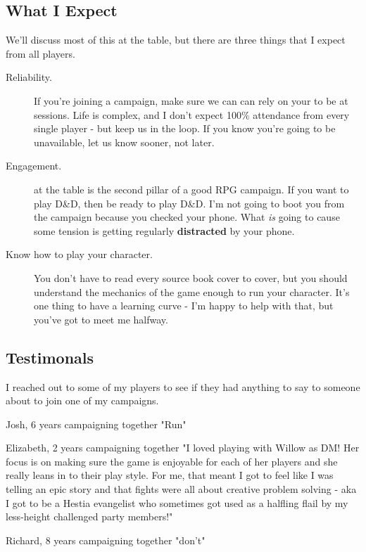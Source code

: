 \subsection{What I Expect}

We'll discuss most of this at the table, but there are three things that I expect from all players.

\begin{description}
    \item[Reliability.] If you're joining a campaign, make sure we can can rely on your to be at sessions. Life is complex, and I don't expect 100\% attendance from every single player - but keep us in the loop. If you know you're going to be unavailable, let us know sooner, not later.

    \item[Engagement.] at the table is the second pillar of a good RPG campaign. If you want to play D\&D, then be ready to play D\&D. I'm not going to boot you from the campaign because you checked your phone. What \textit{is} going to cause some tension is getting regularly \textbf{distracted} by your phone.

    \item[Know how to play your character.] You don't have to read every source book cover to cover, but you should understand the mechanics of the game enough to run your character. It's one thing to have a learning curve - I'm happy to help with that, but you've got to meet me halfway.
\end{description}

\subsection {Testimonals}

I reached out to some of my players to see if they had anything to say to someone about to join one of my campaigns.

\begin{DndQuotation}{Josh, 6 years campaigning together}
"Run"
\end{DndQuotation}

\begin{DndQuotation}{Elizabeth, 2 years campaigning together}
"I loved playing with Willow as DM! Her focus is on making sure the game is enjoyable for each of her players and she really leans in to their play style. For me, that meant I got to feel like I was telling an epic story and that fights were all about creative problem solving - aka I got to be a Hestia evangelist who sometimes got used as a halfling flail by my less-height challenged party members!"
\end{DndQuotation}

\begin{DndQuotation}{Richard, 8 years campaigning together}
"don't"
\end{DndQuotation}

